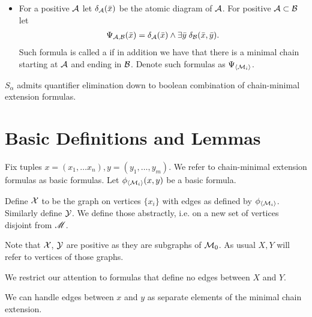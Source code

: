 \begin{Definition}
\begin{itemize}
  \item For a positive $\mathcal A$ let $\delta_\mathcal A(\bar x)$ be the atomic diagram of $\mathcal A$. For positive $\mathcal A \subset \mathcal B$ let 
    \begin{align*}
      \Psi_{\mathcal A,\mathcal B}(\bar x) = \delta_\mathcal A(\bar x) \wedge \exists \bar y \; \delta_\mathcal B(\bar x, \bar y).
    \end{align*}
    Such formula is called a  if in addition we have that there is a minimal chain starting at 
    $\mathcal A$ and ending in $\mathcal B$.
    Denote such formulas as $\Psi_{\left\langle \mathcal M_i \right\rangle}$.
  \end{itemize}
\end{Definition}

\begin{Theorem} 
  $S_\alpha$ admits quantifier elimination down to boolean combination of chain-minimal extension formulas.
\end{Theorem}


\section{Basic Definitions and Lemmas}

Fix tuples $x = (x_1, \ldots x_n), y = (y_1, \ldots, y_m)$.
We refer to chain-minimal extension formulas as basic formulas.
Let $\phi_{\left\langle \mathcal M_i \right\rangle}(x, y)$ be a basic formula.

\begin{Definition}
  Define $\mathcal X$ to be the graph on vertices $\{x_i\}$ with edges as defined by $\phi_{\left\langle \mathcal M_i \right\rangle}$.
  Similarly define $\mathcal Y$.
  We define those abstractly, i.e. on a new set of vertices disjoint from $\mathscr M$.
\end{Definition}

Note that $\mathcal X$, $\mathcal Y$ are positive as they are subgraphs of $\mathcal M_0$.
As usual $X, Y$ will refer to vertices of those graphs.

We restrict our attention to formulas that define no edges between $X$ and $Y$.

\begin{Note} \label{note_edges}
  We can handle edges between $x$ and $y$ as separate elements of the minimal chain extension.
\end{Note}

